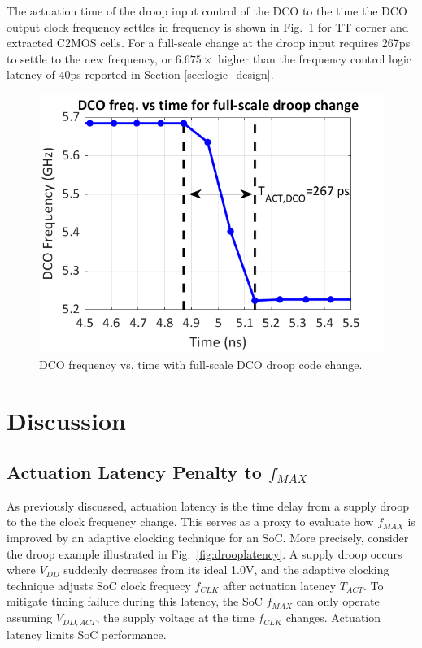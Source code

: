 \documentclass[twoside,9pt,journal,letterpage]{IEEEtran}
\begin{document}
The actuation time of the droop input control of the DCO to the time the DCO output clock frequency settles in frequency is shown in Fig.\ \ref{fig:dco_response} for TT corner and extracted C2MOS cells. For a full-scale change at the droop input requires 267ps to settle to the new frequency, or $6.675\times$ higher than the frequency control logic latency of 40ps reported in Section \ref{sec:logic_design}.

\vspace{-10pt}
\begin{figure}[h]
	\centering
	\includegraphics[width=0.7\columnwidth]{fig_dco_response}
	\caption{DCO frequency vs. time with full-scale DCO droop code change.}
	\label{fig:dco_response}
\end{figure}

\section{Discussion}
\label{sec:discussion}
\subsection{Actuation Latency Penalty to $f_{MAX}$}
\label{sec:actuation_latency}
As previously discussed, actuation latency is the time delay from a supply droop to the the clock frequency change. This serves as a proxy to evaluate how $f_{MAX}$ is improved by an adaptive clocking technique for an SoC. More precisely, consider the droop example illustrated in Fig.\ \ref{fig:drooplatency}. A supply droop occurs where $V_{DD}$ suddenly decreases from its ideal 1.0V, and the adaptive clocking technique adjusts SoC clock frequecy $f_{CLK}$ after actuation latency $T_{ACT}$. To mitigate timing failure during this latency, the SoC $f_{MAX}$ can only operate assuming $V_{DD,ACT}$, the supply voltage at the time $f_{CLK}$ changes. Actuation latency limits SoC performance.
\end{document}
